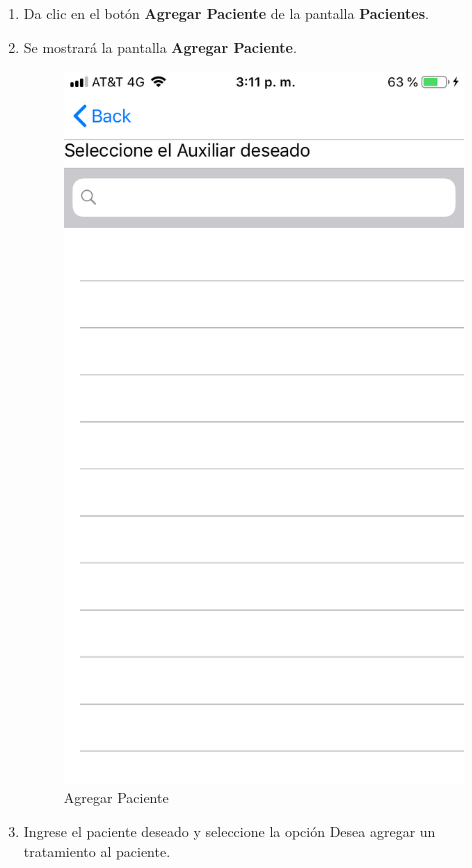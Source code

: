 \begin{enumerate}
	\item Da clic en el botón \textbf{Agregar Paciente} de la pantalla \textbf{Pacientes}.
	
	\item Se mostrará la pantalla \textbf{Agregar Paciente}.
	\newpage
	\begin{figure}[!htbp]			
		\hypertarget{fig:AgregarPaciente}{\hspace{1pt}}
		\begin{center}
			\includegraphics[height=0.4\textheight]{Paciente/AgregarAuxiliar/images/AgregarAuxiliar}
			\caption{Agregar Paciente}
			\label{fig:AgregarPaciente}
		\end{center}
	\end{figure}

	
	\item Ingrese el paciente deseado y seleccione la opción Desea agregar un tratamiento al paciente.
	

	
\end{enumerate}


